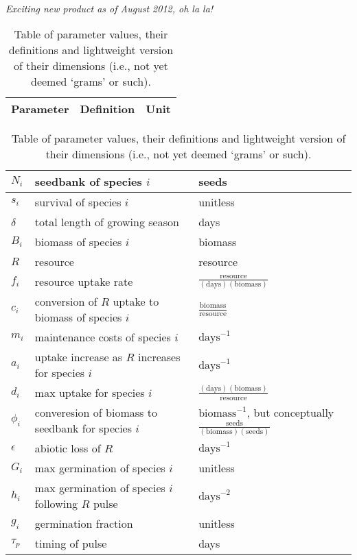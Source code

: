 \documentclass[11pt,a4paper,oneside]{article}
\begin{document}
\newpage 
{}\\
\noindent \emph{Exciting new product as of August 2012, oh la la!}
\begin{center}
\begin{table}[h!]
\caption{Table of parameter values, their definitions and lightweight version of their dimensions (i.e., not yet deemed `grams' or such).}
\begin{tabular}{ | p{3.0cm} | p{6.0cm} | p{4.0cm} |}
\hline 
Parameter & Definition & Unit \\ \hline 
\end{tabular}
\begin{tabular}{ | p{3.0cm} | p{6.0cm} | p{4.0cm} |}
\(N_{i}\) & seedbank of species \(i\) & seeds \\ \hline
\(s_{i}\) & survival of species \(i\) & unitless \\ \hline
\(\delta\) & total length of growing season & days\\ \hline
\(B_{i}\) & biomass of species \(i\) & biomass \\ \hline
\(R\) & resource & resource\\ \hline
\(f_{i}\) & resource uptake rate &  \(\frac{\text{resource}}{(\text{days})(\text{biomass})}\)\\ \hline
\(c_{i}\) & conversion of \(R\) uptake to biomass of species \(i\) &  \(\frac{\text{biomass}}{\text{resource}}\) \\ \hline
\(m_{i}\) & maintenance costs of species \(i\) & \(\text{days}^{-1}\) \\ \hline
\(a_{i}\) & uptake increase as \(R\) increases for species \(i\) & \(\text{days}^{-1}\) \\ \hline
\(d_{i}\) & max uptake for species \(i\) & \(\frac{(\text{days})(\text{biomass})}{\text{resource}}\) \\ \hline
\(\phi_{i}\) & converesion of biomass to seedbank for species \(i\) & \(\text{biomass}^{-1}\), but conceptually \(\frac{\text{seeds}}{(\text{biomass})(\text{seeds})}\) \\ \hline
\(\epsilon\) & abiotic loss of \(R\) &  \(\text{days}^{-1}\) \\ \hline
\(G_{i}\) & max germination of species \(i\) & unitless \\ \hline
\(h_{i}\) & max germination of species \(i\) following \(R\) pulse & \(\text{days}^{-2}\) \\ \hline
\(g_{i}\) & germination fraction & unitless \\ \hline
\(\tau_{p}\) & timing of pulse & days \\ \hline

\end{tabular}
\end{table}
\end{center}
\end{document}
